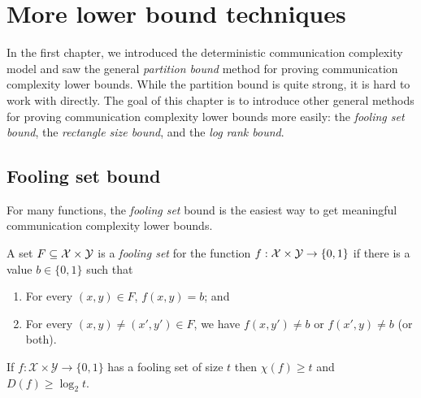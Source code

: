\chapter[CH02]{More lower bound techniques}

In the first chapter, we introduced the deterministic communication complexity 
model and saw the general \emph{partition bound} method for proving communication complexity lower bounds. While the partition bound is quite strong, it is hard to work with directly. The goal of this chapter is to introduce other general methods for proving communication complexity lower bounds more easily: the \emph{fooling set bound}, the \emph{rectangle size bound}, and the \emph{log rank bound}.

\newpage \section{Fooling set bound}

For many functions, the \emph{fooling set} bound is the easiest way to get meaningful communication complexity lower bounds.

\begin{definition}
	A set $F \subseteq \mathcal{X} \times \mathcal{Y}$ is a \emph{fooling set} for the function $f : \mathcal{X} \times \mathcal{Y} \to \{0,1\}$ if there is a value $b \in \{0,1\}$ such that
	\begin{enumerate}
		\item For every $(x,y) \in F$, $f(x,y) = b$; and
		\item For every $(x,y) \neq (x',y') \in F$, we have $f(x,y') \neq b$ or $f(x',y) \neq b$ (or both).
	\end{enumerate}
\end{definition}

\begin{lemma}
	If $f : \mathcal{X} \times \mathcal{Y} \to \{0,1\}$ has a fooling set of size $t$ then $\chi(f) \ge t$ and $D(f) \ge \log_2 t$.
\end{lemma}

